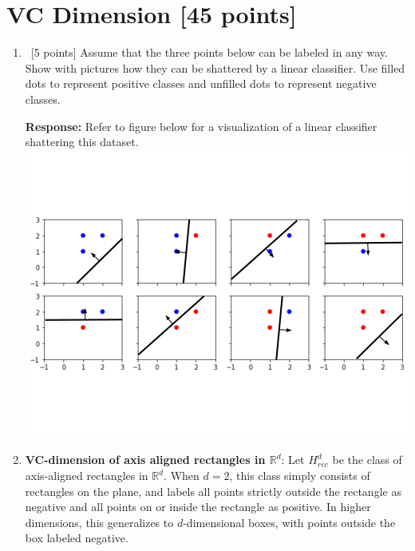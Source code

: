 \section{VC Dimension [45 points]}
\label{sec:vc-dimension}
\begin{enumerate}
\item ~[5 points] Assume that the three points below can be labeled in any way.  Show with pictures how they can be shattered by a linear classifier.  Use filled dots to represent positive classes and unfilled dots to represent negative classes.

  
  \textbf{Response:} Refer to figure below for a visualization of a linear classifier shattering this dataset. \newline
  \includegraphics[scale=0.4]{./img/part3_1.png}
  
\item {\bf VC-dimension of axis aligned rectangles in $\mathbb{R}^d$}:
  Let $H^d_{rec}$ be the class of axis-aligned rectangles in
  $\mathbb{R}^d$. When $d=2$, this class simply consists of rectangles
  on the plane, and labels all points strictly outside the rectangle
  as negative and all points on or inside the rectangle as positive.
  In higher dimensions, this generalizes to $d$-dimensional boxes,
  with points outside the box labeled negative.


\end{enumerate}
